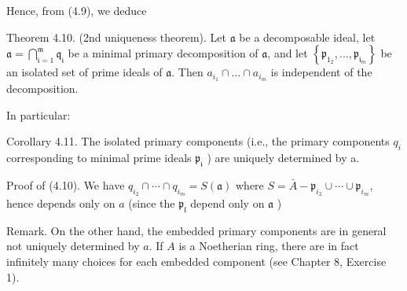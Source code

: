 \documentclass{standalone}
\theoremstyle{definition}
\theoremstyle{remark}
\begin{document}
Hence, from (4.9), we deduce

Theorem 4.10. (2nd uniqueness theorem). Let $\mathfrak{a}$ be a decomposable
ideal, let $\mathfrak{a}=\bigcap_{\mathfrak{i}=1}^{\mathfrak{m}}
\mathfrak{q}_{\mathfrak{i}}$ be a minimal primary decomposition of
$\mathfrak{a}$, and let $\left\{\mathfrak{p}_{\mathfrak{1}_{2}}, \ldots,
\mathfrak{p}_{\mathfrak{i}_{m}}\right\}$ be an isolated set of prime ideals of
$\mathfrak{a}$. Then $a_{i_{1}} \cap \ldots \cap a_{i_{m}}$ is independent of
the decomposition.

In particular:

Corollary 4.11. The isolated primary components (i.e., the primary components
$q_{i}$ corresponding to minimal prime ideals $\mathfrak{p}_{\mathfrak{i}}$ )
are uniquely determined by a.

Proof of (4.10). We have $q_{i_{2}} \cap \cdots \cap q_{i_{m}}=S(\mathfrak{a})$
where $S=\bar{A}-\mathfrak{p}_{i_{2}} \cup \cdots \cup \mathfrak{p}_{i_{m}}$,
hence depends only on $a$ (since the $\mathfrak{p}_{\mathfrak{l}}$ depend only
on $\mathfrak{a}$ )

Remark. On the other hand, the embedded primary components are in general not
uniquely determined by $a$. If $A$ is a Noetherian ring, there are in fact
infinitely many choices for each embedded component (see Chapter 8, Exercise 1).
\end{document}
